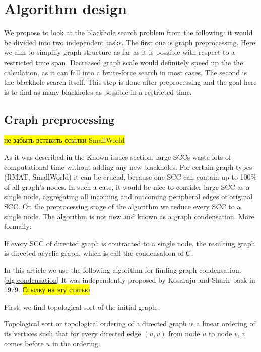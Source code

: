 \documentclass{svproc}
\newcommand{\FIXME}[1]{ %
	\colorbox{yellow}{#1}
}
\newcommand{\FIXME}[1]{ %
}
\begin{document}
\section{Algorithm design}
We propose to look at the blackhole search problem from the following: it would be divided into two independent tasks. 
The first one is graph preprocessing. Here we aim to simplify graph structure as far as it is possible with respect to a restricted time span. 
Decreased graph scale would definitely speed up the the calculation, as it can fall into a brute-force search in most cases.
The second is the blackhole search itself. This step is done after preprocessing and the goal here is to find as many blackholes as possible in a restricted time.

%
\subsection{Graph preprocessing}
\FIXME{не забыть вставить ссылки SmallWorld \cite{watts1999networks}}

As it was described in the Known issues section, large SCCs waste lots of computational time without adding any new blackholes. 
For certain graph types (RMAT, SmallWorld\cite{watts1999networks}) it can be crucial, because one SCC can contain up to 100\% of all graph's nodes. 
In such a case, it would be nice to consider large SCC as a single node, aggregating all incoming and outcoming peripheral edges
of original SCC.
On the preprocessing stage of the algorithm we reduce every SCC to a single node. The algorithm is not new and known as a graph condensation.
More formally:

\begin{definition}
If every SCC of directed graph is contracted to a single node, the resulting graph is directed acyclic graph, which is call the condensation of G.
\end{definition}

In this article we use the following algorithm for finding graph condensation. \ref{alg:condensation}
It was independently proposed by Kosaraju and Sharir back in 1979. \FIXME{Ссылку на эту статью}

First, we find topological sort of the initial graph..

\begin{definition}
Topological sort or topological ordering of a directed graph is a linear ordering of 
its vertices such that for every directed edge $(u,v)$ from node $u$ to node $v$,
$v$ comes before $u$ in the ordering.
\end{definition}
\end{document}
